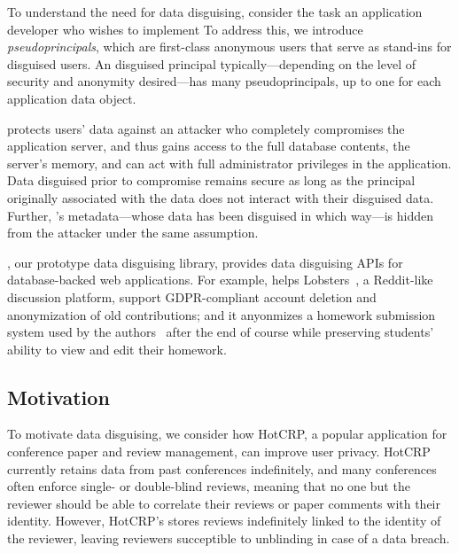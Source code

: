 %
To understand the need for data disguising, consider the task an application
developer who wishes to implement 
%
%
%
%
To address this, we introduce \emph{pseudoprincipals}, which are first-class anonymous
users that serve as stand-ins for disguised users.
%
An disguised principal typically---depending on the level of security and anonymity
desired---has many pseudoprincipals, up to one for each application data object.
%

%
\sys protects users' data against an attacker who completely compromises the
application server, and thus gains access to the full database contents, the server's
memory, and can act with full administrator privileges in the application.
%
Data disguised prior to compromise remains secure as long as the principal
originally associated with the data does not interact with their disguised
data.
%
Further, \sys's metadata---\eg whose data has been disguised in which way---is
hidden from the attacker under the same assumption.
%


%
\sys, our prototype data disguising library, provides data disguising APIs for
database-backed web applications.
%
For example, \sys helps Lobsters~\cite{lobsters}, a Reddit-like discussion platform,
support GDPR-compliant account deletion and anonymization of old contributions; and it
anyonmizes a homework submission system used by the authors~\cite{websubmit-rs-anon}
after the end of course while preserving students' ability to view and edit their
homework.
%


\subsection{Motivation}
To motivate data disguising, we consider how HotCRP, a popular application for conference paper and
review management, can improve user privacy.  HotCRP currently retains data from past conferences
indefinitely, and many conferences often enforce single- or double-blind reviews, meaning that no
one but the reviewer should be able to correlate their reviews or paper comments with their
identity. However, HotCRP's stores reviews indefinitely linked to the identity of the reviewer,
leaving reviewers succeptible to unblinding in case of a data breach.

